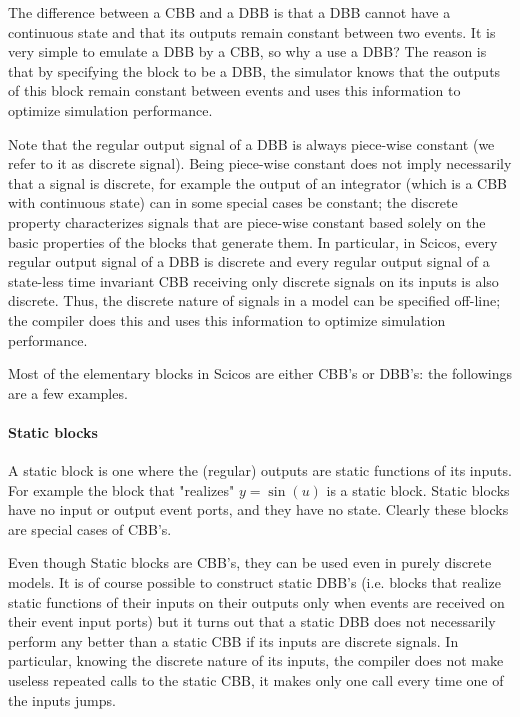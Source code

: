 \documentclass{book}
\begin{document}
The difference between a CBB and a DBB is that a DBB cannot have a continuous
state and that its outputs remain constant between two events. It is
very simple to emulate a DBB by a CBB, so why a use a DBB? The reason is that
by specifying the block to be a DBB, the simulator knows that the outputs
of this block remain constant between events and uses this information
to optimize simulation performance.

Note that the regular output signal of a DBB is always
piece-wise constant (we refer to it as discrete signal). Being
piece-wise constant does not imply necessarily that a signal is
discrete, for example the output of an integrator (which is a CBB with
continuous state) can in some special cases be constant; the discrete
property characterizes signals that are piece-wise constant based
solely on
the basic properties of the blocks that generate them. In particular,
in Scicos, every regular 
output signal of a DBB is discrete and every regular output signal of
a state-less time invariant CBB receiving only discrete signals on
its inputs is also discrete. Thus, the  discrete nature of signals in a model can be
specified off-line; the compiler does this and uses this information
to optimize simulation performance.

\bigskip

Most of the elementary blocks in Scicos are either CBB's or DBB's: the
followings are a few examples.

\paragraph{Static blocks}
A static block is one where the (regular) outputs are static functions
of its inputs. For example the block that "realizes" $y=\sin(u)$ is a
static block. Static blocks have no input or output event ports, and
they have no state. Clearly these blocks are special cases of CBB's. 

Even though Static blocks are CBB's, they can be used even in
purely discrete models. It is of course possible to construct static
DBB's (i.e.  blocks that realize static functions of their inputs on
their outputs only when events are received on their event input
ports) but it turns out that a 
static DBB does not necessarily perform any better than a static CBB
if its inputs are discrete signals. In particular, knowing the
discrete nature of its inputs, the compiler does not make useless
repeated calls to the static CBB, it makes only one call every time one
of the inputs jumps.
\end{document}
